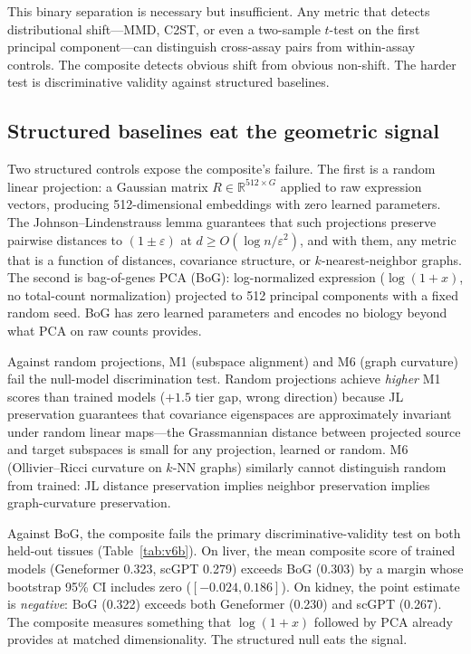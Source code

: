 \documentclass[9pt,lineno]{elife}
\begin{document}
This binary separation is necessary but insufficient. Any metric that detects distributional shift---MMD, C2ST, or even a two-sample $t$-test on the first principal component---can distinguish cross-assay pairs from within-assay controls. The composite detects obvious shift from obvious non-shift. The harder test is discriminative validity against structured baselines.

\subsection{Structured baselines eat the geometric signal}

Two structured controls expose the composite's failure. The first is a random linear projection: a Gaussian matrix $R \in \mathbb{R}^{512 \times G}$ applied to raw expression vectors, producing 512-dimensional embeddings with zero learned parameters. The Johnson--Lindenstrauss lemma guarantees that such projections preserve pairwise distances to $(1 \pm \varepsilon)$ at $d \geq O(\log n / \varepsilon^2)$, and with them, any metric that is a function of distances, covariance structure, or $k$-nearest-neighbor graphs. The second is bag-of-genes PCA (BoG): log-normalized expression ($\log(1 + x)$, no total-count normalization) projected to 512 principal components with a fixed random seed. BoG has zero learned parameters and encodes no biology beyond what PCA on raw counts provides.

Against random projections, M1 (subspace alignment) and M6 (graph curvature) fail the null-model discrimination test. Random projections achieve \emph{higher} M1 scores than trained models ($+1.5$ tier gap, wrong direction) because JL preservation guarantees that covariance eigenspaces are approximately invariant under random linear maps---the Grassmannian distance between projected source and target subspaces is small for any projection, learned or random. M6 (Ollivier--Ricci curvature on $k$-NN graphs) similarly cannot distinguish random from trained: JL distance preservation implies neighbor preservation implies graph-curvature preservation.

Against BoG, the composite fails the primary discriminative-validity test on both held-out tissues (Table~\ref{tab:v6b}). On liver, the mean composite score of trained models (Geneformer 0.323, scGPT 0.279) exceeds BoG (0.303) by a margin whose bootstrap 95\% CI includes zero ($[-0.024, 0.186]$). On kidney, the point estimate is \emph{negative}: BoG (0.322) exceeds both Geneformer (0.230) and scGPT (0.267). The composite measures something that $\log(1+x)$ followed by PCA already provides at matched dimensionality. The structured null eats the signal.
\end{document}
